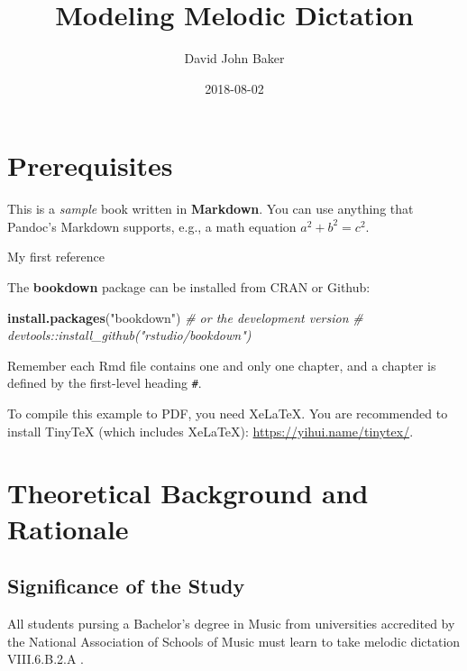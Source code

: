\documentclass[]{book}
\title{Modeling Melodic Dictation}
\author{David John Baker}
\date{2018-08-02}
\newenvironment{Shaded}{\begin{snugshade}}{\end{snugshade}}
\newcommand{\CommentTok}[1]{\textcolor[rgb]{0.56,0.35,0.01}{\textit{#1}}}
\newcommand{\KeywordTok}[1]{\textcolor[rgb]{0.13,0.29,0.53}{\textbf{#1}}}
\newcommand{\NormalTok}[1]{#1}
\newcommand{\StringTok}[1]{\textcolor[rgb]{0.31,0.60,0.02}{#1}}
\theoremstyle{definition}
\theoremstyle{definition}
\theoremstyle{definition}
\theoremstyle{remark}
\begin{document}
\maketitle

{
\setcounter{tocdepth}{1}
\tableofcontents
}
\hypertarget{prerequisites}{%
\chapter{Prerequisites}\label{prerequisites}}

This is a \emph{sample} book written in \textbf{Markdown}. You can use
anything that Pandoc's Markdown supports, e.g., a math equation
\(a^2 + b^2 = c^2\).

My first reference \citep{margulisModelMelodicExpectation2005}

The \textbf{bookdown} package can be installed from CRAN or Github:

\begin{Shaded}
\begin{Highlighting}[]
\KeywordTok{install.packages}\NormalTok{(}\StringTok{"bookdown"}\NormalTok{)}
\CommentTok{# or the development version}
\CommentTok{# devtools::install_github("rstudio/bookdown")}
\end{Highlighting}
\end{Shaded}

Remember each Rmd file contains one and only one chapter, and a chapter
is defined by the first-level heading \texttt{\#}.

To compile this example to PDF, you need XeLaTeX. You are recommended to
install TinyTeX (which includes XeLaTeX):
\url{https://yihui.name/tinytex/}.

\hypertarget{intro}{%
\chapter{Theoretical Background and Rationale}\label{intro}}

\hypertarget{significance-of-the-study}{%
\section{Significance of the Study}\label{significance-of-the-study}}

All students pursing a Bachelor's degree in Music from universities
accredited by the National Association of Schools of Music must learn to
take melodic dictation \citep{NASM201718HandbookPdf2018} VIII.6.B.2.A .
\end{document}
